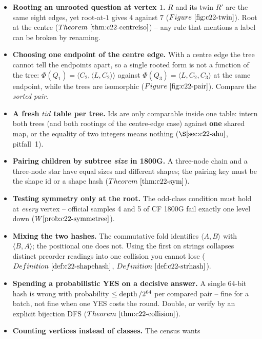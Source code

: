 \begin{itemize}[nosep, leftmargin=1.4em]
  \item \textbf{Rooting an unrooted question at vertex \(1\).} \(R\) and its twin \(R'\) are
        the same eight edges, yet root-at-\(1\) gives \(4\) against \(7\)
        (\(\figref{c22-twin}\)).  Root at the centre (\(\thmref{c22-centreiso}\)) -- any
        rule that mentions a label can be broken by renaming.
  \item \textbf{Choosing one endpoint of the centre edge.} With a centre edge the tree
        cannot tell the endpoints apart, so a single rooted form is not a function of the
        tree: \(\Phi(Q_1)=\langle C_2,\langle L,C_2\rangle\rangle\) against
        \(\Phi(Q_3)=\langle L,C_2,C_3\rangle\) at the same endpoint, while the trees are
        isomorphic (\(\figref{c22-pair}\)).  Compare the \emph{sorted pair}.
  \item \textbf{A fresh \(\mathit{tid}\) table per tree.} Ids are only comparable inside one
        table: intern both trees (and both rootings of the centre-edge case) against
        \textbf{one} shared map, or the equality of two integers means nothing
        (\(\secref{c22-ahu}\), pitfall~1).
  \item \textbf{Pairing children by subtree \emph{size} in 1800G.} A three-node chain and a
        three-node star have equal sizes and different shapes; the pairing key must be the
        shape id or a shape hash (\(\thmref{c22-sym}\)).
  \item \textbf{Testing symmetry only at the root.} The odd-class condition must hold at
        \emph{every} vertex -- official samples 4 and 5 of CF 1800G fail exactly one level
        down (\(\probref{c22-symmetree}\)).
  \item \textbf{Mixing the two hashes.} The commutative fold identifies
        \(\langle A,B\rangle\) with \(\langle B,A\rangle\); the positional one does not.
        Using the first on strings collapses distinct preorder readings into one collision
        you cannot lose (\(\defref{c22-shapehash}\), \(\defref{c22-strhash}\)).
  \item \textbf{Spending a probabilistic YES on a decisive answer.} A single \(64\)-bit
        hash is wrong with probability \(\le\operatorname{depth}/2^{64}\) per compared pair -- fine for
        a batch, not fine when one YES costs the round.  Double, or verify by an explicit
        bijection DFS (\(\thmref{c22-collision}\)).
  \item \textbf{Counting vertices instead of classes.} The census wants

\end{itemize}

